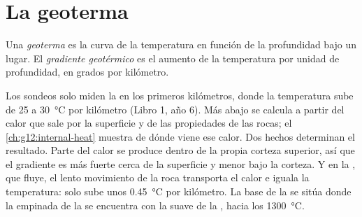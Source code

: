 \section{La geoterma}

\begin{definition}\label{def:g11:lithosphere-asthenosphere:geotherm}
Una \emph{geoterma} es la curva de la temperatura en función
de la profundidad bajo un lugar. El \emph{gradiente
geotérmico} es el aumento de
la temperatura por unidad de profundidad, en grados por kilómetro.
\end{definition}

Los sondeos solo miden la  en los primeros kilómetros, donde la
temperatura sube de 25 a \qty{30}{\celsius} por kilómetro (Libro 1,
año 6). Más abajo se calcula a partir del calor que sale por la superficie y
de las propiedades de las rocas; el \cref{ch:g12:internal-heat}
muestra de dónde viene ese calor. Dos hechos determinan el resultado. Parte
del calor se produce dentro de la propia corteza superior, así que el
gradiente es más fuerte cerca de la superficie y menor bajo la corteza. Y en
la , que fluye, el lento movimiento de la roca transporta el calor
e iguala la temperatura: solo sube unos \qty{0.45}{\celsius} por kilómetro. La
base de la  se sitúa donde la  empinada de la  se
encuentra con la  suave de la , hacia los
\qty{1300}{\celsius}.

